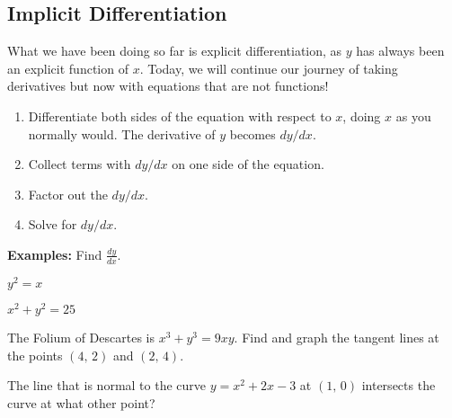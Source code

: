 \documentclass[addpoints, 12pt]{exam}
\begin{document}
\subsection*{Implicit Differentiation}
What we have been doing so far is explicit differentiation, as $y$ has always been an explicit function of $x$. Today, we will continue our journey of taking derivatives but now with equations that are not functions!\\
\begin{tcolorbox}[title= STEPS FOR IMPLICIT DIFFERENTIATION,black,sharp corners,colback=white,colbacktitle=white,coltitle=black,boxrule=1pt]
    \begin{enumerate}
        \item Differentiate both sides of the equation with respect to $x$, doing $x$ as you normally would. The derivative of $y$ becomes $dy/dx$.
        \item Collect terms with $dy/dx$ on one side of the equation.
        \item Factor out the $dy/dx$.
        \item Solve for $dy/dx$.
    \end{enumerate}
\end{tcolorbox}
\vspace{.15cm}
\nodindent\textbf{Examples:} Find $\displaystyle\frac{dy}{dx}$.
\begin{questions}
    \begin{minipage}{.45\linewidth}
    \question $\displaystyle y^2=x$
    \end{minipage}
    \hfill
    \begin{minipage}{.45\linewidth}
    \question $\displaystyle x^2+y^2=25$
    \end{minipage}
    
    
    \question The Folium of Descartes is $x^3+y^3=9xy$. Find and graph the tangent lines at the points $(4,\,2)$ and $(2,\,4)$.
    
    
    
    \newpage
    
    \question The line that is normal to the curve $y=x^2+2x-3$ at $(1,\,0)$ intersects the curve at what other point?
    
\end{questions}
\end{document}
